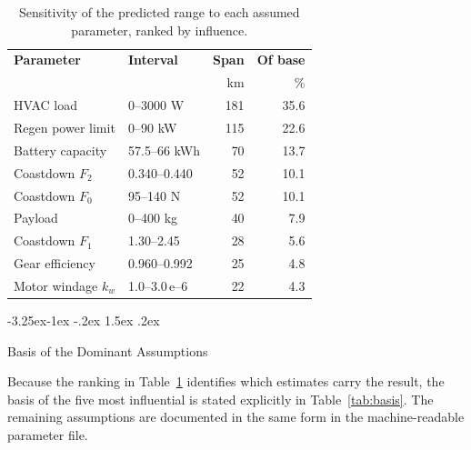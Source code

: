\documentclass[twocolumn]{article}
\makeatletter
\renewcommand\subsection{\@startsection{subsection}{2}{\z@}%
  {-3.25ex\@plus -1ex \@minus -.2ex}%
  {1.5ex \@plus .2ex}%
  {\raggedright\normalfont\large\bfseries}}
\makeatother
\begin{document}
\begin{table}[H]
\centering
\caption{Sensitivity of the predicted range to each assumed parameter, ranked
by influence.}
\label{tab:tornado}
\footnotesize
\begin{tabular}{@{}llrr@{}}
\toprule
\textbf{Parameter} & \textbf{Interval} & \textbf{Span} & \textbf{Of base} \\
 & & km & \% \\
\midrule
HVAC load            & 0--3000 W          & 181 & 35.6 \\
Regen power limit    & 0--90 kW           & 115 & 22.6 \\
Battery capacity     & 57.5--66 kWh       &  70 & 13.7 \\
Coastdown $F_2$      & 0.340--0.440       &  52 & 10.1 \\
Coastdown $F_0$      & 95--140 N          &  52 & 10.1 \\
Payload              & 0--400 kg          &  40 &  7.9 \\
Coastdown $F_1$      & 1.30--2.45         &  28 &  5.6 \\
Gear efficiency      & 0.960--0.992       &  25 &  4.8 \\
Motor windage $k_w$  & 1.0--3.0\,e--6     &  22 &  4.3 \\
\bottomrule
\end{tabular}
\end{table}

\subsection{Basis of the Dominant Assumptions}

Because the ranking in Table~\ref{tab:tornado} identifies which estimates
carry the result, the basis of the five most influential is stated explicitly
in Table~\ref{tab:basis}. The remaining assumptions are documented in the same
form in the machine-readable parameter file.
\end{document}
